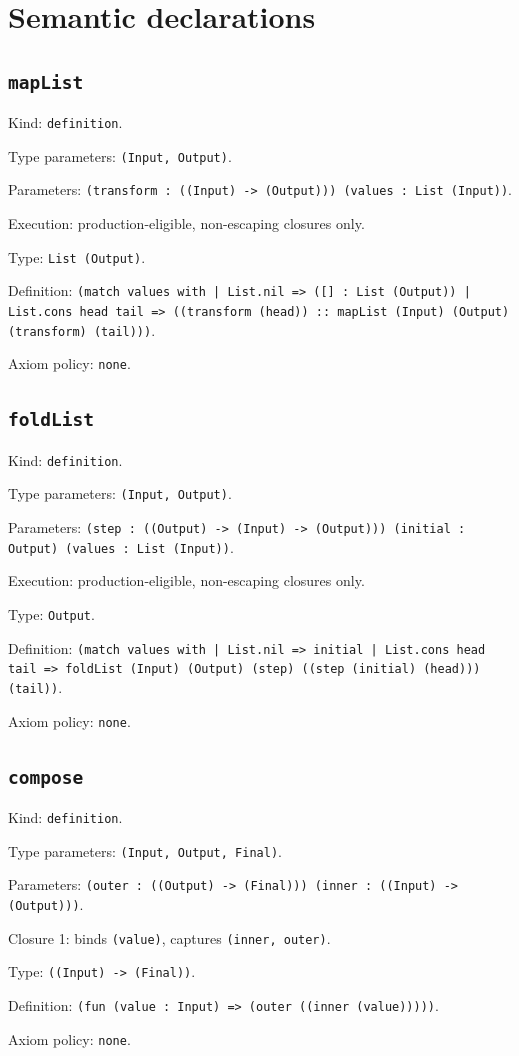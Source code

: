 \documentclass[11pt]{article}
\begin{document}
\section*{Semantic declarations}
\subsection*{\texttt{mapList}}
\noindent Kind: \texttt{definition}.\par
\noindent Type parameters: \texttt{(Input, Output)}.\par
\noindent Parameters: \texttt{(transform : ((Input) -> (Output))) (values : List (Input))}.\par
\noindent Execution: production-eligible, non-escaping closures only.\par
\noindent Type: \texttt{List (Output)}.\par
\noindent Definition: \texttt{(match values with | List.nil => ([] : List (Output)) | List.cons head tail => ((transform (head)) :: mapList (Input) (Output) (transform) (tail)))}.\par
\noindent Axiom policy: \texttt{none}.\par
\subsection*{\texttt{foldList}}
\noindent Kind: \texttt{definition}.\par
\noindent Type parameters: \texttt{(Input, Output)}.\par
\noindent Parameters: \texttt{(step : ((Output) -> (Input) -> (Output))) (initial : Output) (values : List (Input))}.\par
\noindent Execution: production-eligible, non-escaping closures only.\par
\noindent Type: \texttt{Output}.\par
\noindent Definition: \texttt{(match values with | List.nil => initial | List.cons head tail => foldList (Input) (Output) (step) ((step (initial) (head))) (tail))}.\par
\noindent Axiom policy: \texttt{none}.\par
\subsection*{\texttt{compose}}
\noindent Kind: \texttt{definition}.\par
\noindent Type parameters: \texttt{(Input, Output, Final)}.\par
\noindent Parameters: \texttt{(outer : ((Output) -> (Final))) (inner : ((Input) -> (Output)))}.\par
\noindent Closure 1: binds \texttt{(value)}, captures \texttt{(inner, outer)}.\par
\noindent Type: \texttt{((Input) -> (Final))}.\par
\noindent Definition: \texttt{(fun (value : Input) => (outer ((inner (value)))))}.\par
\noindent Axiom policy: \texttt{none}.\par
\end{document}
